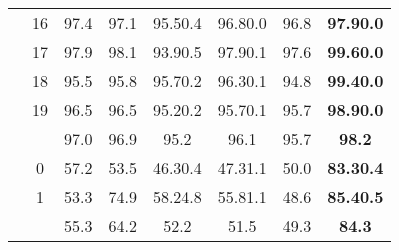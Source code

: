 \documentclass{article}
\begin{document}
\begin{table}[!ht]
\begin{tabular}{c c c c c c c c}
 & 16 & 97.4 & 97.1 & 95.50.4 & 96.80.0 & 96.8 & \textbf{97.90.0}\\
 & 17 & 97.9 & 98.1 & 93.90.5 & 97.90.1 & 97.6 & \textbf{99.60.0}\\
 & 18 & 95.5 & 95.8 & 95.70.2 & 96.30.1 & 94.8 & \textbf{99.40.0}\\
 & 19 & 96.5 & 96.5 & 95.20.2 & 95.70.1 & 95.7 & \textbf{98.90.0}\\
&   & 97.0 & 96.9 & 95.2 & 96.1 & 95.7 & \textbf{98.2}\\
\midrule
{} & 0 & 57.2 & 53.5 & 46.30.4 & 47.31.1 & 50.0 & \textbf{83.30.4}\\
 & 1 & 53.3 & 74.9 & 58.24.8 & 55.81.1 & 48.6 & \textbf{85.40.5}\\
&   & 55.3 & 64.2 & 52.2 & 51.5 & 49.3 & \textbf{84.3}\\

\bottomrule[1.5pt]
\end{tabular}
\end{table}
\end{document}
